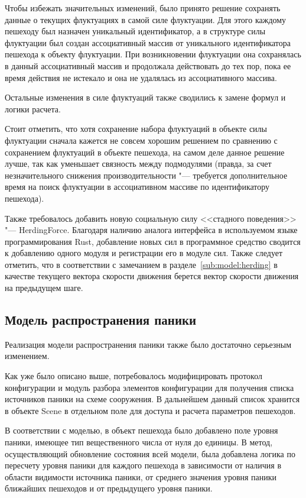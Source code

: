 Чтобы избежать значительных изменений, было принято решение сохранять данные о текущих флуктуациях в самой силе флуктуации.
Для этого каждому пешеходу был назначен уникальный идентификатор, а в структуре силы флуктуации был создан ассоциативный
массив от уникального идентификатора пешехода к объекту флуктуации.
При возникновении флуктуации она сохранялась в данный ассоциативный массив и продолжала действовать до тех пор, пока ее
время действия не истекало и она не удалялась из ассоциативного массива.

Остальные изменения в силе флуктуаций также сводились к замене формул и логики расчета.

Стоит отметить, что хотя сохранение набора флуктуаций в объекте силы флуктуации сначала кажется не совсем хорошим решением
по сравнению с сохранением флуктуаций в объекте пешехода, на самом деле данное решение лучше, так как уменьшает связность
между подмодулями (правда, за счет незначительного снижения производительности "--- требуется дополнительное время на поиск
флуктуации в ассоциативном массиве по идентификатору пешехода).

Также требовалось добавить новую социальную силу <<стадного поведения>> "--- Her\-ding\-For\-ce.
Благодаря наличию аналога интерфейса в используемом языке программирования Rust, добавление новых сил в программное средство
сводится к добавлению одного модуля и регистрации его в модуле сил. Также следует отметить, что в соответствии с замечанием в
разделе~\ref{sub:model:herding} в качестве текущего вектора скорости движения берется вектор скорости движения на предыдущем
шаге.

\subsection{Модель распространения паники}
\label{sec:development:core:panic_spread}

Реализация модели распространения паники также было достаточно серьезным изменением.

Как уже было описано выше, потребовалось модифицировать протокол конфигурации и модуль разбора элементов конфигурации для
получения списка источников паники на схеме сооружения.
В дальнейшем данный список хранится в объекте Sce\-ne в отдельном поле для доступа и расчета параметров пешеходов.

В соответствии с моделью, в объект пешехода было добавлено поле уровня паники, имеющее тип вещественного числа от нуля до единицы.
В метод, осуществляющий обновление состояния всей модели, была добавлена логика по пересчету уровня паники для каждого пешехода
в зависимости от наличия в области видимости источника паники, от среднего значения уровня паники ближайших пешеходов и от предыдущего уровня паники.

